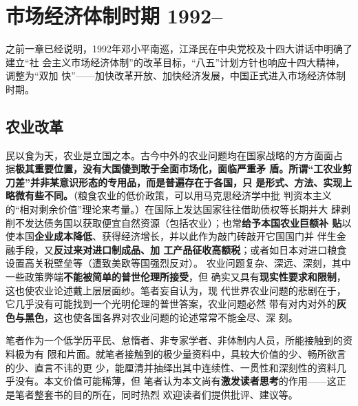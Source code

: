 \chapter{市场经济体制时期 1992--}

之前一章已经说明，1992年邓小平南巡，江泽民在中央党校及十四大讲话中明确了建立“社
会主义市场经济体制”的改革目标，“八五”计划方针也响应十四大精神，调整为“双加
快”——加快改革开放、加快经济发展，中国正式进入市场经济体制时期。


\section{农业改革}

% 






民以食为天，农业是立国之本。古今中外的农业问题均在国家战略的方方面面占
据\textbf{极其重要位置，没有大国傻到敢于全面市场化，面临严重矛
  盾。}\textbf{所谓“工农业剪刀差”并非某意识形态的专用品，而是普遍存在于各国，只
  是形式、方法、实现上略微有些不同。}（粮食农业的低价政策，可以用马克思经济学中批
判资本主义的“相对剩余价值”理论来考量。）在国际上发达国家往往借助债权等长期并大
肆剥削不发达债务国以获取便宜自然资源（包括农业）；也常\textbf{给予本国农业巨额补
  贴}以使本国\textbf{企业成本降低}、获得经济增长，并以此作为敲门砖敲开它国国门并
伴生金融手段，又\textbf{反过来对进口制成品、加
  工产品征收高额税}；或者如日本对进口粮食设置高关税壁垒等（遭致美欧等国强烈反对）。
农业问题复杂、深远、深刻，其中一些政策弊端\textbf{不能被简单的普世伦理所接受}，但
确实又具有\textbf{现实性要求和限制}，这也使农业论述戴上层层面纱。笔者妄自认为，现
代世界农业问题的悲剧在于，它几乎没有可能找到一个光明伦理的普世答案，农业问题必然
带有对内对外的\textbf{灰色与黑色}，这也使各国各界对农业问题的论述常常不能全尽、深
刻。

笔者作为一个低学历平民、怠惰者、非专家学者、非体制内人员，所能接触到的资料极为有
限和片面。就笔者接触到的极少量资料中，具较大价值的少、畅所欲言的少、直言不讳的更
少，能厘清并抽绎出其中连续性、一贯性和深刻性的资料几乎没有。本文价值可能稀薄，但
笔者认为本文尚有\textbf{激发读者思考}的作用——这正是笔者整套书的目的所在，同时热烈
欢迎读者们提供批评、建议等。


